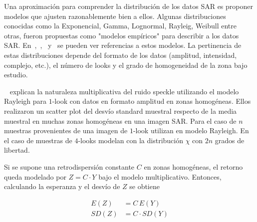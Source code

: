 Una aproximación para comprender la distribución de los datos SAR es proponer modelos que ajusten razonablemente bien a ellos. Algunas distribuciones conocidas como la Exponencial, Gamma, Lognormal, Rayleig, Weibull entre otras, fueron propuestas como "modelos empíricos"  para describir a los datos SAR. En~\citet{FreryLibro2019},~\citet{oliverquegan98},~\citet{Yanasse93} y~\citet{Lee2009} se pueden ver referencias a estos modelos. La pertinencia de estas distribuciones depende del formato de los datos (amplitud, intensidad, complejo, etc.), el número de looks y el grado de homogeneidad de la zona bajo estudio.

%


~\citet{Lee2009} explican la naturaleza multiplicativa del ruido speckle utilizando el modelo Rayleigh para $1$-look con datos en formato amplitud en zonas homogéneas. Ellos realizaron un scatter plot del desvío standard muestral respecto de la media muestral en muchas zonas homogéneas en una imagen SAR. Para el caso de $n$ muestras provenientes de una imagen de $1$-look utilizan en modelo Rayleigh. En el caso de muestras de $4$-looks modelan con la distribución $\chi$ con $2n$ grados de libertad.

Si se supone una retrodispersión constante $C$ en zonas homogéneas, el retorno queda modelado por $Z=C \cdot Y$ bajo el modelo multiplicativo. Entonces, calculando la esperanza y el desvío de $Z$ se obtiene

\begin{align}
E(Z)&=C \, E(Y)\label{esperanza}\\
SD(Z)&=C \cdot SD(Y)\label{desvio}
\end{align} 


